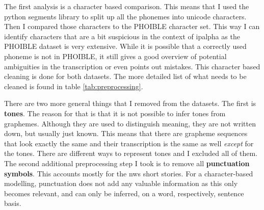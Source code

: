 The first analysis is a character based comparison. This means that I used the python segments library to split up all the phonemes into unicode characters. Then I compared those characters to the PHOIBLE character set. This way I can identify characters that are a bit suspicious in the context of \ac{ipalpha} as the PHOIBLE dataset is very extensive. While it is possible that a correctly used phoneme is not in PHOIBLE, it still gives a good overview of potential ambiguities in the transcription or even points out mistakes. This character based cleaning is done for both datasets. The more detailed list of what needs to be cleaned is found in table \ref{tab:preprocessing}.

There are two more general things that I removed from the datasets. The first is \textbf{tones}. The reason for that is that it is not possible to infer tones from graphemes. Although they are used to distinguish meaning, they are not written down, but usually just known. This means that there are grapheme sequences that look exactly the same and their transcription is the same as well \textit{except} for the tones. There are different ways to represent tones and I excluded all of them. The second additional preprocessing step I took is to remove all \textbf{punctuation symbols}. This accounts mostly for the \ac{nws} short stories. For a character-based modelling, punctuation does not add any valuable information as this only becomes relevant, and can only be inferred, on a word, respectively, sentence basis.    

